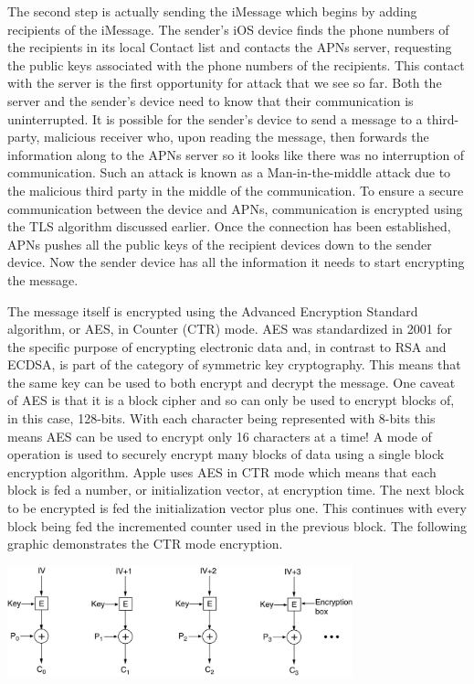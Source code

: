 The second step is actually sending the iMessage which begins by adding recipients of the iMessage.  The sender's iOS device finds the phone numbers of the recipients in its local Contact list and contacts the APNs server, requesting the public keys associated with the phone numbers of the recipients.  This contact with the server is the first opportunity for attack that we see so far.  Both the server and the sender's device need to know that their communication is uninterrupted.  It is possible for the sender's device to send a message to a third-party, malicious receiver who, upon reading the message, then forwards the information along to the APNs server so it looks like there was no interruption of communication.  Such an attack is known as a Man-in-the-middle attack due to the malicious third party in the middle of the communication.  To ensure a secure communication between the device and APNs, communication is encrypted using the TLS algorithm discussed earlier.  Once the connection has been established, APNs pushes all the public keys of the recipient devices down to the sender device.  Now the sender device has all the information it needs to start encrypting the message.

The message itself is encrypted using the Advanced Encryption Standard algorithm, or AES, in Counter (CTR) mode.  AES was standardized in 2001 for the specific purpose of encrypting electronic data and, in contrast to RSA and ECDSA, is part of the category of symmetric key cryptography.  This means that the same key can be used to both encrypt and decrypt the message.  One caveat of AES is that it is a block cipher and so can only be used to encrypt blocks of, in this case, 128-bits.  With each character being represented with 8-bits this means AES can be used to encrypt only 16 characters at a time!  A mode of operation is used to securely encrypt many blocks of data using a single block encryption algorithm.  Apple uses AES in CTR mode which means that each block is fed a number, or initialization vector, at encryption time.  The next block to be encrypted is fed the initialization vector plus one.  This continues with every block being fed the incremented counter used in the previous block.  The following graphic demonstrates the CTR mode encryption.

\begin{center}
    \includegraphics[width=0.75\textwidth]{ctr.jpg}
\end{center}


